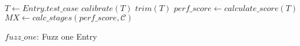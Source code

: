 
\begin{algorithm}
    $T \leftarrow Entry.test\_case$\;
    $calibrate(T)$\;
    $trim(T)$\;
    $perf\_score \leftarrow calculate\_score(T)$\;
    $MX \leftarrow calc\_stages(perf\_score, \mathcal{C})$\;
    \caption{$fuzz\_one$: Fuzz one Entry}
    \label{algo:fuzzone}
\end{algorithm}
